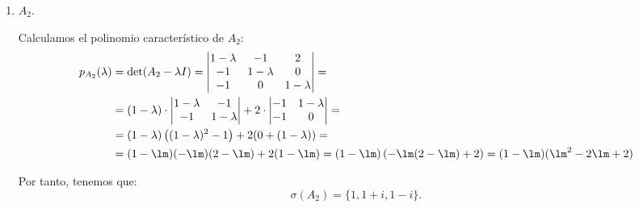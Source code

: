 \begin{ejercicio}
\begin{enumerate}
        \item $A_2$.
        
        Calculamos el polinomio característico de $A_2$:
        \begin{align*}
            p_{A_2}(\lambda) &= \det(A_2 - \lambda I)
            = \begin{vmatrix}
                1 - \lambda & -1 & 2\\
                -1 & 1 - \lambda & 0\\
                -1 & 0 & 1 - \lambda
            \end{vmatrix}
            =\\&= (1 - \lambda)\cdot \begin{vmatrix}
                1 - \lambda & -1\\
                -1 & 1 - \lambda
            \end{vmatrix}
            + 2\cdot \begin{vmatrix}
                -1 & 1 - \lambda\\
                -1 & 0
            \end{vmatrix}
            =\\&= (1 - \lambda)\left((1 - \lambda)^2 - 1\right) + 2(0 + (1 - \lambda))
            =\\&= (1-\lm)(-\lm)(2-\lm) +2(1-\lm)
            = (1-\lm)\left(-\lm(2-\lm) +2\right)
            = (1-\lm)(\lm^2 -2\lm +2)
        \end{align*}

        Por tanto, tenemos que:
        \begin{equation*}
            \sigma(A_2) = \{1, 1+i, 1-i\}.
        \end{equation*}


\end{enumerate}
\end{ejercicio}
